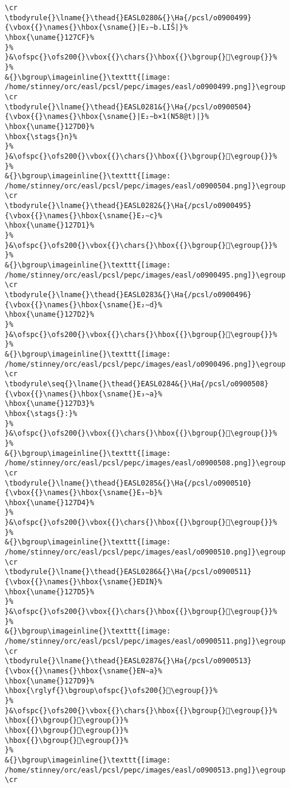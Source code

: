 \begin{verbatim}
\cr
\tbodyrule{}\lname{}\thead{}EASL0280&{}\Ha{/pcsl/o0900499}{\vbox{{}\names{}\hbox{\sname{}|E₂∼b.LIŠ|}%
\hbox{\uname{}127CF}%
}%
}&\ofspc{}\ofs200{}\vbox{{}\chars{}\hbox{{}\bgroup{}𒟏\egroup{}}%
}%
&{}\bgroup\imageinline{}\texttt{[image: /home/stinney/orc/easl/pcsl/pepc/images/easl/o0900499.png]}\egroup
\cr
\tbodyrule{}\lname{}\thead{}EASL0281&{}\Ha{/pcsl/o0900504}{\vbox{{}\names{}\hbox{\sname{}|E₂∼b×1(N58@t)|}%
\hbox{\uname{}127D0}%
\hbox{\stags{}n}%
}%
}&\ofspc{}\ofs200{}\vbox{{}\chars{}\hbox{{}\bgroup{}𒟐\egroup{}}%
}%
&{}\bgroup\imageinline{}\texttt{[image: /home/stinney/orc/easl/pcsl/pepc/images/easl/o0900504.png]}\egroup
\cr
\tbodyrule{}\lname{}\thead{}EASL0282&{}\Ha{/pcsl/o0900495}{\vbox{{}\names{}\hbox{\sname{}E₂∼c}%
\hbox{\uname{}127D1}%
}%
}&\ofspc{}\ofs200{}\vbox{{}\chars{}\hbox{{}\bgroup{}𒟑\egroup{}}%
}%
&{}\bgroup\imageinline{}\texttt{[image: /home/stinney/orc/easl/pcsl/pepc/images/easl/o0900495.png]}\egroup
\cr
\tbodyrule{}\lname{}\thead{}EASL0283&{}\Ha{/pcsl/o0900496}{\vbox{{}\names{}\hbox{\sname{}E₂∼d}%
\hbox{\uname{}127D2}%
}%
}&\ofspc{}\ofs200{}\vbox{{}\chars{}\hbox{{}\bgroup{}𒟒\egroup{}}%
}%
&{}\bgroup\imageinline{}\texttt{[image: /home/stinney/orc/easl/pcsl/pepc/images/easl/o0900496.png]}\egroup
\cr
\tbodyrule\seq{}\lname{}\thead{}EASL0284&{}\Ha{/pcsl/o0900508}{\vbox{{}\names{}\hbox{\sname{}E₃∼a}%
\hbox{\uname{}127D3}%
\hbox{\stags{}:}%
}%
}&\ofspc{}\ofs200{}\vbox{{}\chars{}\hbox{{}\bgroup{}𒟓\egroup{}}%
}%
&{}\bgroup\imageinline{}\texttt{[image: /home/stinney/orc/easl/pcsl/pepc/images/easl/o0900508.png]}\egroup
\cr
\tbodyrule{}\lname{}\thead{}EASL0285&{}\Ha{/pcsl/o0900510}{\vbox{{}\names{}\hbox{\sname{}E₃∼b}%
\hbox{\uname{}127D4}%
}%
}&\ofspc{}\ofs200{}\vbox{{}\chars{}\hbox{{}\bgroup{}𒟔\egroup{}}%
}%
&{}\bgroup\imageinline{}\texttt{[image: /home/stinney/orc/easl/pcsl/pepc/images/easl/o0900510.png]}\egroup
\cr
\tbodyrule{}\lname{}\thead{}EASL0286&{}\Ha{/pcsl/o0900511}{\vbox{{}\names{}\hbox{\sname{}EDIN}%
\hbox{\uname{}127D5}%
}%
}&\ofspc{}\ofs200{}\vbox{{}\chars{}\hbox{{}\bgroup{}𒟕\egroup{}}%
}%
&{}\bgroup\imageinline{}\texttt{[image: /home/stinney/orc/easl/pcsl/pepc/images/easl/o0900511.png]}\egroup
\cr
\tbodyrule{}\lname{}\thead{}EASL0287&{}\Ha{/pcsl/o0900513}{\vbox{{}\names{}\hbox{\sname{}EN∼a}%
\hbox{\uname{}127D9}%
\hbox{\rglyf{}\bgroup\ofspc{}\ofs200{}𒟙\egroup{}}%
}%
}&\ofspc{}\ofs200{}\vbox{{}\chars{}\hbox{{}\bgroup{}𒟖\egroup{}}%
\hbox{{}\bgroup{}𒟗\egroup{}}%
\hbox{{}\bgroup{}𒟘\egroup{}}%
\hbox{{}\bgroup{}𒟙\egroup{}}%
}%
&{}\bgroup\imageinline{}\texttt{[image: /home/stinney/orc/easl/pcsl/pepc/images/easl/o0900513.png]}\egroup
\cr

\end{verbatim}
